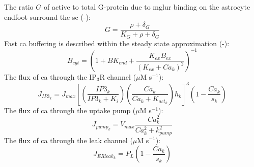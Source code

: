 \documentclass[11pt]{elsarticle}
\newcommand{\mus}{$\mu$M s$^{-1}$\xspace}
\newcommand{\ca}{\gls{ca}\xspace}
\begin{document}
%
The ratio $G$ of active to total G-protein due to \gls{mglur} binding on the astrocyte endfoot surround the \gls{sc} (-):
\begin{equation}
G = \frac{\rho + \delta_G}{K_G + \rho + \delta_G}
\end{equation}
%
Fast \ca buffering is described within the steady state approximation (-):
\begin{equation}
B_{cyt} = \left( 1 + BK_{end} + \frac{K_{ex} B_{ex}}{(K_{ex} + Ca_k)^2}  \right)^{-1}
\end{equation}
%
The flux of \ca through the IP$_3$R channel (\mus):
\begin{equation}
J_{IP3_k} = J_{max} \left[  \left(\frac{IP3_k}{IP3_k + K_i}\right) \left(\frac{Ca_k}{Ca_k + K_{act_k}}\right) h_k \right]^3
\left( 1 - \frac{Ca_k}{s_k}  \right)
\end{equation}
%
The flux of \ca through the uptake pump (\mus):
\begin{equation}
J_{pump_k} = V_{max} \frac{Ca_k^2}{Ca_k^2 + k_{pump}^2}
\end{equation}
%
The flux of \ca through the leak channel (\mus):
\begin{equation}
J_{ERleak_k} = P_L \left(  1 - \frac{Ca_k}{s_k}  \right)
\end{equation}
%
\end{document}
